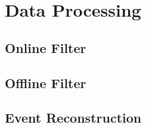 \section{Data Processing}
\label{sec:data-processing}

\subsection{Online Filter}

\subsection{Offline Filter}

\subsection{Event Reconstruction}
\label{sec:event-reconstruction}
